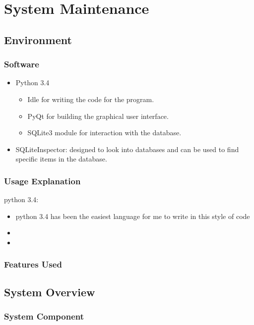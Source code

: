 \chapter{System Maintenance}


\section{Environment}

\subsection{Software}
\begin{itemize}
	\item Python 3.4
	\begin{itemize}
		\item Idle for writing the code for the program.
		\item PyQt for building the graphical user interface.
		\item SQLite3 module for interaction with the database.
	\end{itemize}
	\item SQLiteInspector: designed to look into databases and can be used to find specific items in the database.
\end{itemize}
\subsection{Usage Explanation}
python 3.4:
\begin{itemize}
	\item python 3.4 has been the easiest language for me to write in this style of code  
	\item 
	\item 
\end{itemize}
\subsection{Features Used}

\section{System Overview}

\subsection{System Component}

